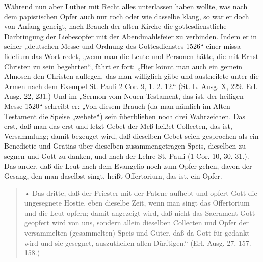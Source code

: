 Während nun aber Luther mit Recht alles unterlassen haben wollte, was nach dem papistischen Opfer auch nur roch oder wie dasselbe klang, so war er doch von Anfang geneigt, nach Brauch der alten Kirche die gottesdienstliche Darbringung der Liebesopfer mit der Abendmahlsfeier zu verbinden. Indem er in seiner „deutschen Messe und Ordnung des Gottesdienstes 1526“ einer missa fidelium das Wort redet, „wenn man die Leute und Personen hätte, die mit Ernst Christen zu sein begehrten“, fährt er fort: „Hier könnt man auch ein gemein Almosen den Christen auflegen, das man williglich gäbe und austheilete unter die Armen nach dem Exempel St. Pauli 2 Cor. 9, 1. 2. 12.“ (St. L. Ausg. X, 229. Erl. Ausg. 22, 231.) Und im „Sermon vom Neuen Testament, das ist, der heiligen Messe 1520“ schreibt er: „Von diesem Brauch (da man nämlich im Alten Testament die Speise „webete“) sein überblieben noch drei Wahrzeichen. Das erst, daß man das erst und letzt Gebet der Meß heißet Collecten, das ist, Versammlung; damit bezeuget wird, daß dieselben Gebet seien gesprochen als ein Benedictie und Gratias über dieselben zusammengetragen Speis, dieselben zu segnen und Gott zu danken, und nach der Lehre St. Pauli (1 Cor. 10, 30. 31.). Das ander, daß die Leut nach dem Evangelio noch zum Opfer gehen, davon der Gesang, den man daselbst singt, heißt Offertorium, das ist, ein Opfer.

\begin{quote}
• Das dritte, daß der Priester mit der Patene aufhebt und opfert Gott die ungesegnete Hostie, eben dieselbe Zeit, wenn man singt das Offertorium und die Leut opfern; damit angezeigt wird, daß nicht das Sacrament Gott geopfert wird von uns, sondern allein dieselben Collecten und Opfer der versammelten (gesammelten) Speis und Güter, daß da Gott für gedankt wird und sie gesegnet, auszutheilen allen Dürftigen.“ (Erl. Ausg. 27, 157. 158.)
\end{quote}

